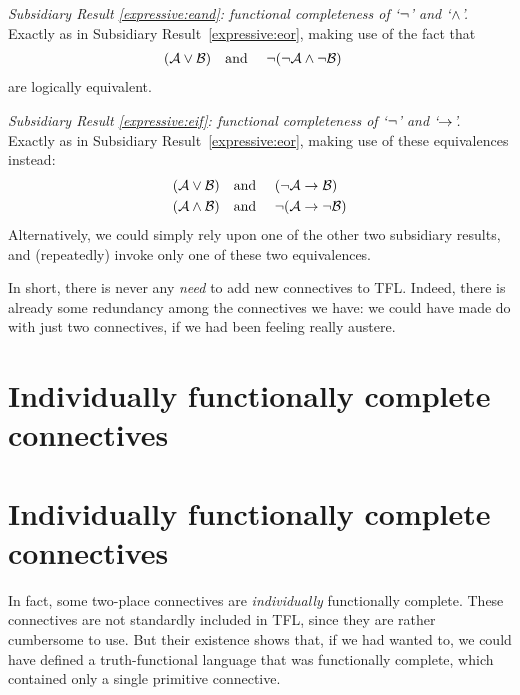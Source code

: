\emph{Subsidiary Result \ref{expressive:eand}: functional completeness of `$\neg$' and `$\wedge$'.} Exactly as in Subsidiary Result~\ref{expressive:eor}, making use of the fact that
		\begin{align*}
		(\mathcal{A} \vee \mathcal{B}) & \text{\quad and \quad}\neg(\neg \mathcal{A} \wedge\neg \mathcal{B})
		\end{align*}
are logically equivalent.

\emph{Subsidiary Result \ref{expressive:eif}: functional completeness of `$\neg$' and `$\rightarrow$'.} Exactly as in Subsidiary Result~\ref{expressive:eor}, making use of these equivalences instead:
		\begin{align*}
		(\mathcal{A} \vee \mathcal{B}) &\text{\quad and \quad} (\neg \mathcal{A} \rightarrow \mathcal{B})\\
		(\mathcal{A} \wedge \mathcal{B}) &\text{\quad and \quad} \neg(\mathcal{A} \rightarrow \neg\mathcal{B})
		\end{align*}
Alternatively, we could simply rely upon one of the other two subsidiary results, and (repeatedly) invoke only one of these two equivalences.

In short, there is never any \emph{need} to add new connectives to TFL. Indeed, there is already some redundancy among the connectives we have: we could have made do with just two connectives, if we had been feeling really austere.

\ifHTMLtarget
\section{Individually functionally complete connectives}
\else
\section[Individually functionally complete connectives][Functionally complete connectives]{Individually functionally complete connectives}
\fi

In fact, some two-place connectives are \emph{individually} functionally complete. These connectives are not standardly included in TFL, since they are rather cumbersome to use. But their existence shows that, if we had wanted to, we could have defined a truth-functional language that was functionally complete, which contained only a single primitive connective.


